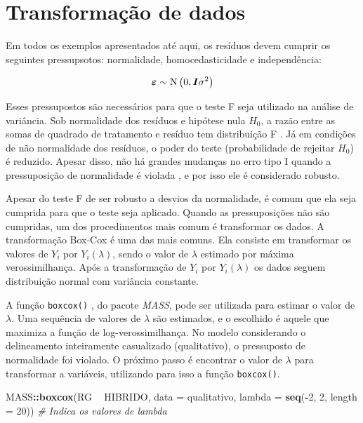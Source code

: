 \documentclass[
]{book}
\newenvironment{Shaded}{\begin{snugshade}}{\end{snugshade}}
\newcommand{\CommentTok}[1]{\textcolor[rgb]{0.56,0.35,0.01}{\textit{#1}}}
\newcommand{\DataTypeTok}[1]{\textcolor[rgb]{0.13,0.29,0.53}{#1}}
\newcommand{\DecValTok}[1]{\textcolor[rgb]{0.00,0.00,0.81}{#1}}
\newcommand{\KeywordTok}[1]{\textcolor[rgb]{0.13,0.29,0.53}{\textbf{#1}}}
\newcommand{\NormalTok}[1]{#1}
\newcommand{\OperatorTok}[1]{\textcolor[rgb]{0.81,0.36,0.00}{\textbf{#1}}}
\newcommand{\StringTok}[1]{\textcolor[rgb]{0.31,0.60,0.02}{#1}}
\begin{document}
\hypertarget{transformauxe7uxe3o-de-dados}{%
\section{Transformação de dados}\label{transformauxe7uxe3o-de-dados}}


Em todos os exemplos apresentados até aqui, os resíduos  devem cumprir os seguintes pressupsotos: normalidade, homocedasticidade e independência:

\[
{\boldsymbol{\varepsilon }} \sim {\rm N}\left( {0,{\boldsymbol{I}}{\sigma ^2}} \right)
\]

Esses pressupostos  são necessários para que o teste F seja utilizado na análise de variância. Sob normalidade  dos resíduos e hipótese nula \(H_0\), a razão entre as somas de quadrado de tratamento e resíduo tem distribuição F \citep{Rencher2008}. Já em condições de não normalidade dos resíduos, o poder do teste  (probabilidade de rejeitar \(H_0\)) é reduzido. Apesar disso, não há grandes mudanças no erro tipo I quando a pressuposição de normalidade é violada \citep{Senoglu2001}, e por isso ele é considerado robusto.

Apesar do teste F de ser robusto a desvios da normalidade, é comum que ela seja cumprida para que o teste seja aplicado. Quando as pressuposições  não são cumpridas, um dos procedimentos mais comum é transformar os dados. A transformação Box-Cox \citep{Box1964}  é uma das mais comuns. Ela consiste em transformar os valores de \(Y_i\) por \(Y_i(\lambda)\), sendo o valor de \(\lambda\) estimado por máxima verossimilhança. Após a transformação de \(Y_i\) por \(Y_i(\lambda)\) os dados seguem distribuição normal com variância constante.

A função \texttt{boxcox()} , do pacote \emph{MASS}, pode ser utilizada para estimar o valor de \(\lambda\). Uma sequência de valores de \(\lambda\) são estimados, e o escolhido é aquele que maximiza a função de log-verossimilhança. No modelo considerando o delineamento inteiramente casualizado (qualitativo), o pressuposto  de normalidade foi violado. O próximo passo é encontrar o valor de \(\lambda\) para transformar a variáveis, utilizando para isso a função \texttt{boxcox()}.

\begin{Shaded}
\begin{Highlighting}[]
\NormalTok{MASS}\OperatorTok{::}\KeywordTok{boxcox}\NormalTok{(RG }\OperatorTok{~}\StringTok{ }\NormalTok{HIBRIDO, }\DataTypeTok{data =}\NormalTok{ qualitativo,}
             \DataTypeTok{lambda =} \KeywordTok{seq}\NormalTok{(}\OperatorTok{-}\DecValTok{2}\NormalTok{, }\DecValTok{2}\NormalTok{, }\DataTypeTok{length =} \DecValTok{20}\NormalTok{)) }\CommentTok{# Indica os valores de lambda }
\end{Highlighting}
\end{Shaded}
\end{document}
